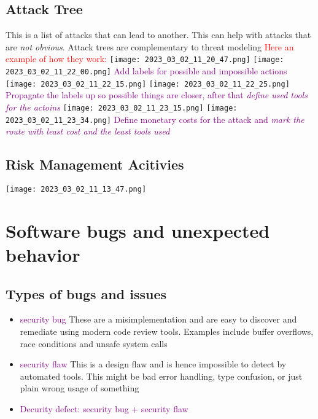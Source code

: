 \documentclass[main.tex,fontsize=8pt,paper=a4,paper=portrait,DIV=calc,]{scrartcl}
\begin{document}
\subsection{Attack Tree}
This is a list of attacks that can lead to another. This can help with attacks that are \emph{not obvious}.\newline
\textcolor{puple}{Attack trees are complementary to threat modeling}\newline
\textcolor{red}{Here an example of how they work:}\newline
\texttt{[image: 2023\_03\_02\_11\_20\_47.png]}
\texttt{[image: 2023\_03\_02\_11\_22\_00.png]}\newline
\textcolor{purple}{Add labels for possible and impossible actions}\newline
\texttt{[image: 2023\_03\_02\_11\_22\_15.png]}
\texttt{[image: 2023\_03\_02\_11\_22\_25.png]}\newline
\textcolor{purple}{Propagate the labels up so possible things are closer, after that \emph{define used tools for the actoins}}\newline
\texttt{[image: 2023\_03\_02\_11\_23\_15.png]}
\texttt{[image: 2023\_03\_02\_11\_23\_34.png]}\newline
\textcolor{purple}{Define monetary costs for the attack and \emph{mark the route with least cost and the least tools used}}

\subsection{Risk Management Acitivies}
\texttt{[image: 2023\_03\_02\_11\_13\_47.png]}\newline

\section{Software bugs and unexpected behavior}
\subsection{Types of bugs and issues}
\begin{itemize}
\item \textcolor{purple}{security bug}\newline
These are a misimplementation and are easy to discover and remediate using modern code review tools.\newline
Examples include buffer overflows, race conditions and unsafe system calls
\item \textcolor{purple}{security flaw}\newline
This is a design flaw and is hence impossible to detect by automated tools. \newline
This might be bad error handling, type confusion, or just plain wrong usage of something
\item \textcolor{purple}{Decurity defect: security bug + security flaw}
\end{itemize} 
\end{document}
